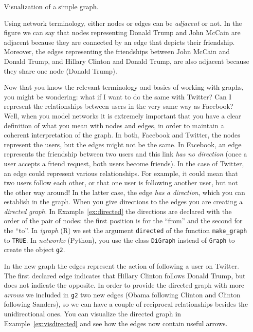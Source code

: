 \begin{ccsexample}
  \caption{Visualization of a simple graph.}
  \label{ex:visgraph}
\end{ccsexample}

Using network terminology, either nodes or edges can be \textit{adjacent} or not. In the figure we can say that nodes representing Donald Trump and John McCain are adjacent because they are connected by an edge that depicts their friendship. Moreover, the edges representing the friendships between John McCain and Donald Trump, and Hillary Clinton and Donald Trump, are also adjacent because they share one node (Donald Trump).

Now that you know the relevant terminology and basics of working with graphs, you might be wondering: what if I want to do the same with Twitter? Can I represent the relationships between users in the very same way as Facebook? Well, when you model networks it is extremely important that you have a clear definition of what you mean with nodes and edges, in order to maintain a coherent interpretation of the graph. In both, Facebook and Twitter, the nodes represent the users, but the edges might not be the same. In Facebook, an edge represents the friendship between two users and this link \textit{has no direction} (once a user accepts a friend request, both users become friends). In the case of Twitter, an edge could represent various relationships. For example, it could mean that two users follow each other, or that one user is following another user, but not the other way around! In the latter case, the edge \textit{has a direction}, which you can establish in the graph. When you give directions to the edges you are creating a \textit{directed graph}. In Example~\ref{ex:directed} the directions are declared with the order of the pair of nodes: the first position is for the ``from'' and the second for the ``to''. In \emph{igraph} (R) we  set the argument \verb+directed+ of the function \texttt{make\_graph} to \verb+TRUE+. In \emph{networkx} (Python), you use the class \texttt{DiGraph} instead of \texttt{Graph} to create the object \texttt{g2}.


In the new graph the edges represent the action of following a user on Twitter. The first declared edge indicates that Hillary Clinton follows Donald Trump, but does not indicate the opposite. In order to provide the directed graph with more \textit{arrows} we included in \texttt{g2} two new edges (Obama following Clinton and Clinton following Sanders), so we can have a couple of reciprocal relationships besides the unidirectional ones. You can visualize the directed graph in Example~\ref{ex:visdirected} and see how the edges now contain useful arrows.

